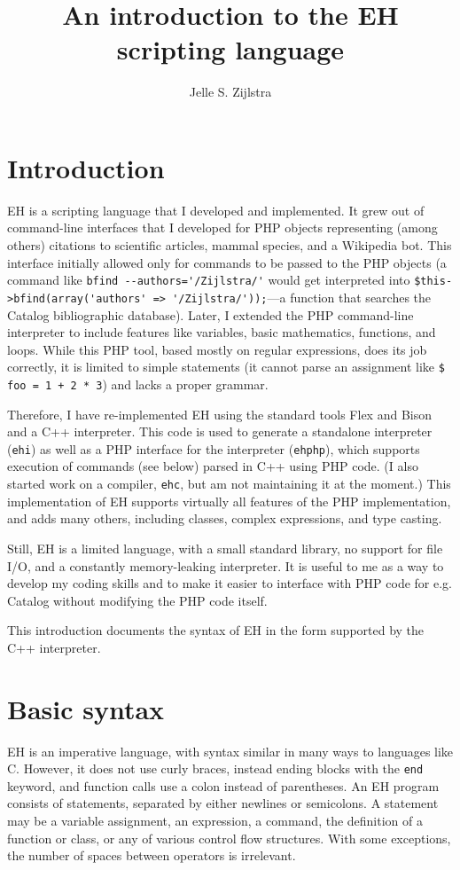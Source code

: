 \documentclass{article}
\begin{document}
\title{An introduction to the EH scripting language}
\author{Jelle S. Zijlstra}
\maketitle
\tableofcontents
\pagebreak
\section{Introduction}
EH is a scripting language that I developed and implemented. 
It grew out of command-line interfaces that I developed for PHP objects representing (among others) citations to scientific articles, mammal species, and a Wikipedia bot. 
This interface initially allowed only for commands to be passed to the PHP objects (a command like \verb#bfind --authors='/Zijlstra/'# would get interpreted into \verb#$this->bfind(array('authors' => '/Zijlstra/'));#---a function that searches the Catalog bibliographic database). 
Later, I extended the PHP command-line interpreter to include features like variables, basic mathematics, functions, and loops. 
While this PHP tool, based mostly on regular expressions, does its job correctly, it is limited to simple statements (it cannot parse an assignment like \verb#$ foo = 1 + 2 * 3#) and lacks a proper grammar.

Therefore, I have re-implemented EH using the standard tools Flex and Bison and a C++ interpreter. 
This code is used to generate a standalone interpreter (\verb#ehi#) as well as a PHP interface for the interpreter (\verb#ehphp#), which supports execution of commands (see below) parsed in C++ using PHP code. 
(I also started work on a compiler, \verb#ehc#, but am not maintaining it at the moment.) 
This implementation of EH supports virtually all features of the PHP implementation, and adds many others, including classes, complex expressions, and type casting.

Still, EH is a limited language, with a small standard library, no support for file I/O, and a constantly memory-leaking interpreter. 
It is useful to me as a way to develop my coding skills and to make it easier to interface with PHP code for e.g. Catalog without modifying the PHP code itself.

This introduction documents the syntax of EH in the form supported by the C++ interpreter.

\section{Basic syntax}
EH is an imperative language, with syntax similar in many ways to languages like C. 
However, it does not use curly braces, instead ending blocks with the \verb#end# keyword, and function calls use a colon instead of parentheses. 
An EH program consists of statements, separated by either newlines or semicolons. 
A statement may be a variable assignment, an expression, a command, the definition of a function or class, or any of various control flow structures. 
With some exceptions, the number of spaces between operators is irrelevant.
\end{document}
